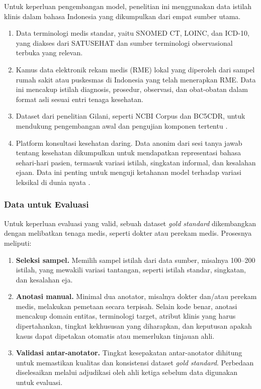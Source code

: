 Untuk keperluan pengembangan model, penelitian ini menggunakan data istilah klinis dalam bahasa Indonesia yang dikumpulkan dari empat sumber utama.

\begin{enumerate}
    \item Data terminologi medis standar, yaitu SNOMED CT, LOINC, dan ICD-10, yang diakses dari SATUSEHAT dan sumber terminologi observasional terbuka yang relevan.
    \item Kamus data elektronik rekam medis (RME) lokal yang diperoleh dari sampel rumah sakit atau puskesmas di Indonesia yang telah menerapkan RME. Data ini mencakup istilah diagnosis, prosedur, observasi, dan obat-obatan dalam format asli sesuai entri tenaga kesehatan.
    \item Dataset dari penelitian Gilani, seperti NCBI Corpus dan BC5CDR, untuk mendukung pengembangan awal dan pengujian komponen tertentu \citep{gilani_cde-mapper_2025}.
    \item Platform konsultasi kesehatan daring. Data anonim dari sesi tanya jawab tentang kesehatan dikumpulkan untuk mendapatkan representasi bahasa sehari-hari pasien, termasuk variasi istilah, singkatan informal, dan kesalahan ejaan. Data ini penting untuk menguji ketahanan model terhadap variasi leksikal di dunia nyata \citep{purwitasari_comparison_2023}.
\end{enumerate}

\subsubsection{Data untuk Evaluasi}

Untuk keperluan evaluasi yang valid, sebuah dataset \textit{gold standard} dikembangkan dengan melibatkan tenaga medis, seperti dokter atau perekam medis. Prosesnya meliputi:

\begin{enumerate}
    \item \textbf{Seleksi sampel.} Memilih sampel istilah dari data sumber, misalnya 100--200 istilah, yang mewakili variasi tantangan, seperti istilah standar, singkatan, dan kesalahan eja.
    \item \textbf{Anotasi manual.} Minimal dua anotator, misalnya dokter dan/atau perekam medis, melakukan pemetaan secara terpisah. Selain kode benar, anotasi mencakup domain entitas, terminologi target, atribut klinis yang harus dipertahankan, tingkat kekhususan yang diharapkan, dan keputusan apakah kasus dapat dipetakan otomatis atau memerlukan tinjauan ahli.
    \item \textbf{Validasi antar-anotator.} Tingkat kesepakatan antar-anotator dihitung untuk memastikan kualitas dan konsistensi dataset \textit{gold standard}. Perbedaan diselesaikan melalui adjudikasi oleh ahli ketiga sebelum data digunakan untuk evaluasi.
\end{enumerate}

